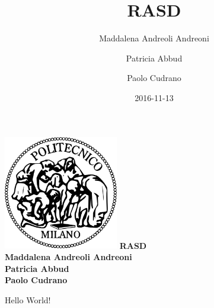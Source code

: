 \documentclass{article}
\title{RASD}
\date{2016-11-13}
\author{
	Maddalena Andreoli Andreoni
	\and
	Patricia Abbud
	\and
	Paolo Cudrano
}
\begin{document}
	\begin{titlepage}
	    \centering
	    \includegraphics[width=5cm]{img/polimi_logo.png} %
	    \vfill
	    {\bfseries\Large
	        RASD\\
	        \vskip4cm
	        Maddalena Andreoli Andreoni\\
					Patricia Abbud\\
	        Paolo Cudrano\\
	    }    
	    \vfill
	    \vfill
	\end{titlepage}
	
  
	Hello World!
	
\end{document}
